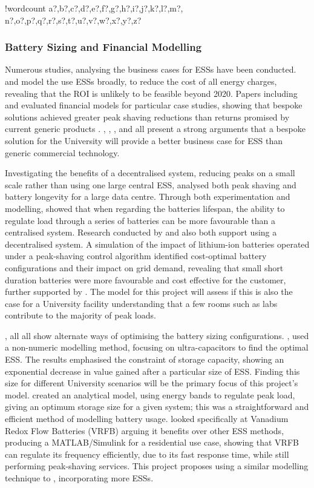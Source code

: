 \documentclass[fontsize=9.5pt]{extarticle}
\numberwithin{figure}{section} %
\newcounter{words}
\newenvironment{counted}{%
  \setcounter{words}{0}
  \SearchList!{wordcount}{\stepcounter{words}}
    {a?,b?,c?,d?,e?,f?,g?,h?,i?,j?,k?,l?,m?,
    n?,o?,p?,q?,r?,s?,t?,u?,v?,w?,x?,y?,z?}
  \UndoBoundary{'}
  \SearchOrder{p;}}{%
  \StopSearching}
\begin{document}
\begin{counted}
\subsubsection{Battery Sizing and Financial
Modelling}\label{battery-sizing-and-financial-modelling}

Numerous studies, analysing the business cases for ESSs have been
conducted. \cite{7555795} and \cite{7555793} model the use ESSs broadly,
to reduce the cost of all energy charges, revealing that the ROI is
unlikely to be feasible beyond 2020. Papers including \cite{1300158} and
\cite{6175723} evaluated financial models for particular case studies,
showing that bespoke solutions achieved greater peak shaving reductions
than returns promised by current generic products \cite{abbpeakshave}.
\cite{7555795}, \cite{7555793}, \cite{1300158}, \cite{6175723} and
\cite{20164002874437} all present a strong arguments that a bespoke
solution for the University will provide a better business case for ESS
than generic commercial technology.

Investigating the benefits of a decentralised system, reducing peaks on
a small scale rather than using one large central ESS, \cite{6604477}
analysed both peak shaving and battery longevity for a large data
centre. Through both experimentation and modelling, \cite{6604477}
showed that when regarding the batteries lifespan, the ability to
regulate load through a series of batteries can be more favourable than
a centralised system. Research conducted by \cite{6348200} and
\cite{Demonstr51:online} also both support using a decentralised system.
A simulation of the impact of lithium-ion batteries operated under a
peak-shaving control algorithm identified cost-optimal battery
configurations and their impact on grid demand, revealing that small
short duration batteries were more favourable and cost effective for the
customer, further supported by \cite{20164002874437}. The model for this
project will assess if this is also the case for a University facility
understanding that a few rooms such as labs contribute to the majority
of peak loads.

\cite{20160601898032}, \cite{Levron201280} all \cite{5371839} all show
alternate ways of optimising the battery sizing configurations.
\cite{5371839}, used a non-numeric modelling method, focusing on
ultra-capacitors to find the optimal ESS. The results emphasised the
constraint of storage capacity, showing an exponential decrease in value
gained after a particular size of ESS. Finding this size for different
University scenarios will be the primary focus of this project's model.
\cite{Levron201280} created an analytical model, using energy bands to
regulate peak load, giving an optimum storage size for a given system;
this was a straightforward and efficient method of modelling battery
usage. \cite{20160601898032} looked specifically at Vanadium Redox Flow
Batteries (VRFB) arguing it benefits over other ESS methods, producing a
MATLAB/Simulink for a residential use case, showing that VRFB can
regulate its frequency efficiently, due to its fast response time, while
still performing peak-shaving services. This project proposes using a
similar modelling technique to \cite{20160601898032}, incorporating more
ESSs.


\end{counted}
\end{document}
